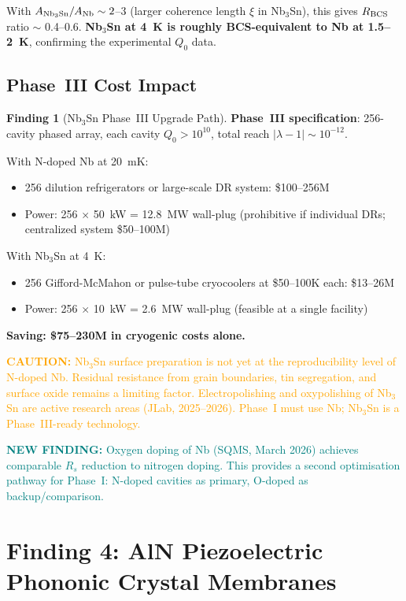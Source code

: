 \documentclass[11pt]{article}
\theoremstyle{definition}
\newtheorem{finding}[theorem]{Finding}
\theoremstyle{remark}
\newcommand{\lam}{|\lambda-1|}
\newcommand{\caution}[1]{\textcolor{orange}{\textbf{CAUTION:} #1}}
\newcommand{\newfinding}[1]{\textcolor{teal}{\textbf{NEW FINDING:} #1}}
\begin{document}
With $A_{\rm Nb_3Sn}/A_{\rm Nb} \sim 2$--3 (larger coherence
length $\xi$ in Nb$_3$Sn), this gives $R_{\rm BCS}$ ratio $\sim$
0.4--0.6. \textbf{Nb$_3$Sn at 4~K is roughly BCS-equivalent to
Nb at 1.5--2~K}, confirming the experimental $Q_0$ data.

\subsection{Phase~III Cost Impact}

\begin{finding}[Nb$_3$Sn Phase~III Upgrade Path]
\label{find:nb3sn_phase3}
\textbf{Phase~III specification}: 256-cavity phased array, each
cavity $Q_0 > 10^{10}$, total reach $\lam \sim 10^{-12}$.

With N-doped Nb at 20~mK:
\begin{itemize}[nosep]
\item 256 dilution refrigerators or large-scale DR system:
  \$100--256M
\item Power: 256 $\times$ 50~kW = 12.8~MW wall-plug (prohibitive
  if individual DRs; centralized system \$50--100M)
\end{itemize}

With Nb$_3$Sn at 4~K:
\begin{itemize}[nosep]
\item 256 Gifford-McMahon or pulse-tube cryocoolers at \$50--100K
  each: \$13--26M
\item Power: 256 $\times$ 10~kW = 2.6~MW wall-plug (feasible at
  a single facility)
\end{itemize}

\textbf{Saving: \$75--230M in cryogenic costs alone.}

\caution{Nb$_3$Sn surface preparation is not yet at the
reproducibility level of N-doped Nb. Residual resistance from grain
boundaries, tin segregation, and surface oxide remains a limiting
factor. Electropolishing and oxypolishing of Nb$_3$Sn are active
research areas (JLab, 2025--2026). Phase~I must use Nb; Nb$_3$Sn is
a Phase~III-ready technology.}

\newfinding{Oxygen doping of Nb (SQMS, March 2026) achieves
comparable $R_s$ reduction to nitrogen doping. This provides a second
optimisation pathway for Phase~I: N-doped cavities as primary,
O-doped as backup/comparison.}
\end{finding}


\section{Finding 4: AlN Piezoelectric Phononic Crystal Membranes}
\label{sec:aln}
\end{document}
